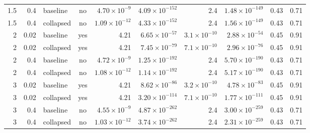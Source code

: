 \documentclass[11pt,letterpaper,fleqn]{article}
\begin{document}
\begin{table}[p]
\begin{adjustbox}{max width=\textwidth}
\begin{tabular}{@{}rrlcrrrrrr@{}}
1.5 & 0.4 & baseline & no & $4.70\times10^{-9}$ & $4.09\times10^{-152}$ & 2.4 & $1.48\times10^{-149}$ & 0.43 & 0.71\\
1.5 & 0.4 & collapsed & no & $1.09\times10^{-12}$ & $4.33\times10^{-152}$ & 2.4 & $1.56\times10^{-149}$ & 0.43 & 0.71\\
2 & 0.02 & baseline & yes & 4.21 & $6.65\times10^{-57}$ & $3.1\times10^{-10}$ & $2.88\times10^{-54}$ & 0.45 & 0.91\\
2 & 0.02 & collapsed & yes & 4.21 & $7.45\times10^{-79}$ & $7.1\times10^{-10}$ & $2.96\times10^{-76}$ & 0.45 & 0.91\\
2 & 0.4 & baseline & no & $4.72\times10^{-9}$ & $1.25\times10^{-192}$ & 2.4 & $5.70\times10^{-190}$ & 0.43 & 0.71\\
2 & 0.4 & collapsed & no & $1.08\times10^{-12}$ & $1.14\times10^{-192}$ & 2.4 & $5.17\times10^{-190}$ & 0.43 & 0.71\\
3 & 0.02 & baseline & yes & 4.21 & $8.62\times10^{-86}$ & $3.2\times10^{-10}$ & $4.78\times10^{-83}$ & 0.45 & 0.91\\
3 & 0.02 & collapsed & yes & 4.21 & $3.20\times10^{-114}$ & $7.1\times10^{-10}$ & $1.77\times10^{-111}$ & 0.45 & 0.91\\
3 & 0.4 & baseline & no & $4.55\times10^{-9}$ & $4.87\times10^{-262}$ & 2.4 & $3.00\times10^{-259}$ & 0.43 & 0.71\\
3 & 0.4 & collapsed & no & $1.03\times10^{-12}$ & $3.74\times10^{-262}$ & 2.4 & $2.31\times10^{-259}$ & 0.43 & 0.71\\
\bottomrule\end{tabular}\end{adjustbox}\end{table}
\end{document}
